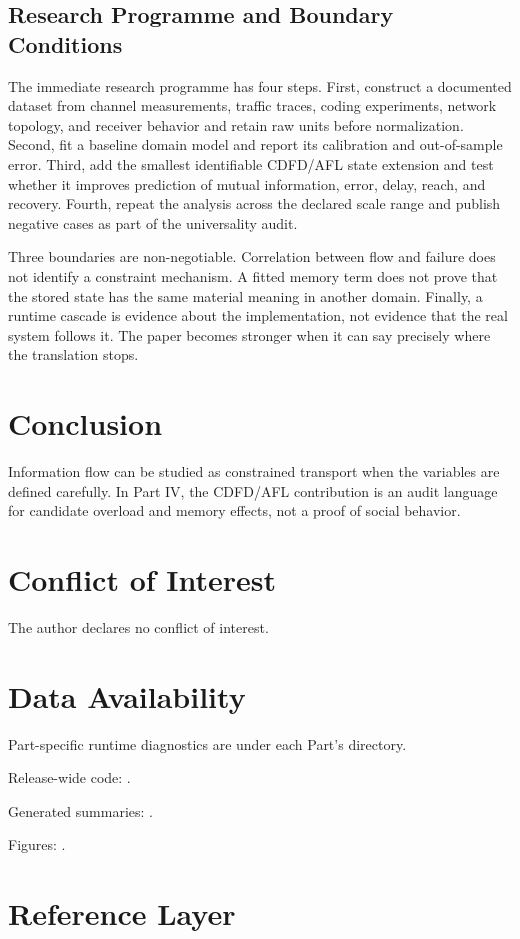 \documentclass[12pt,a4paper]{article}
\begin{document}
\subsection{Research Programme and Boundary Conditions}

The immediate research programme has four steps. First, construct a documented
dataset from channel measurements, traffic traces, coding experiments, network topology, and receiver behavior and retain raw units before normalization.
Second, fit a baseline domain model and report its calibration and out-of-sample
error. Third, add the smallest identifiable CDFD/AFL state extension and test
whether it improves prediction of mutual information, error, delay, reach, and recovery. Fourth, repeat the
analysis across the declared scale range and publish negative cases as part of
the universality audit.

Three boundaries are non-negotiable. Correlation between flow and failure does
not identify a constraint mechanism. A fitted memory term does not prove that
the stored state has the same material meaning in another domain. Finally, a
runtime cascade is evidence about the implementation, not evidence that the
real system follows it. The paper becomes stronger when it can say precisely
where the translation stops.



\section{Conclusion}

Information flow can be studied as constrained transport when the variables are
defined carefully. In Part IV, the CDFD/AFL contribution is an audit language
for candidate overload and memory effects, not a proof of social behavior.

\section*{Conflict of Interest}
The author declares no conflict of interest.

\section*{Data Availability}
Part-specific runtime diagnostics are under each Part's  directory.

Release-wide code: .

Generated summaries: .

Figures: .


\section{Reference Layer}


\end{document}
